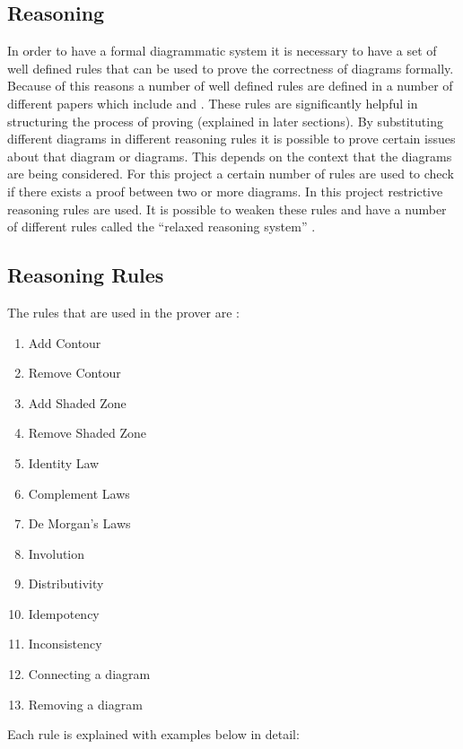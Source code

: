 \documentclass[a4paper]{article}
\begin{document}
\subsection{Reasoning}

In order to have a formal diagrammatic system it is necessary to have a set of well defined rules that can be used to prove the correctness of diagrams formally. Because of this reasons a number of well defined rules are defined in a number of different papers which include \cite{Fish_2007} and \cite{Gem_Judith}. These rules are significantly helpful in structuring the process of proving (explained in later sections). By substituting different diagrams in different reasoning rules it is possible to prove certain issues about that diagram or diagrams. This depends on the context that the diagrams are being considered. For this project a certain number of rules are used to check if there exists a proof between two or more diagrams. In this project restrictive reasoning rules are used. It is possible to weaken these rules and have a number of different rules called the “relaxed reasoning system” \cite{Fish_2007}.

\subsection{Reasoning Rules}
The rules that are used in the prover are :
\begin{enumerate}
\item Add Contour
\item Remove Contour
\item Add Shaded Zone
\item Remove Shaded Zone
\item Identity Law
\item Complement Laws
\item De Morgan's Laws
\item Involution
\item Distributivity
\item Idempotency 
\item Inconsistency
\item Connecting a diagram
\item Removing a diagram
\end{enumerate}

Each rule is explained with examples below in detail:
\end{document}
